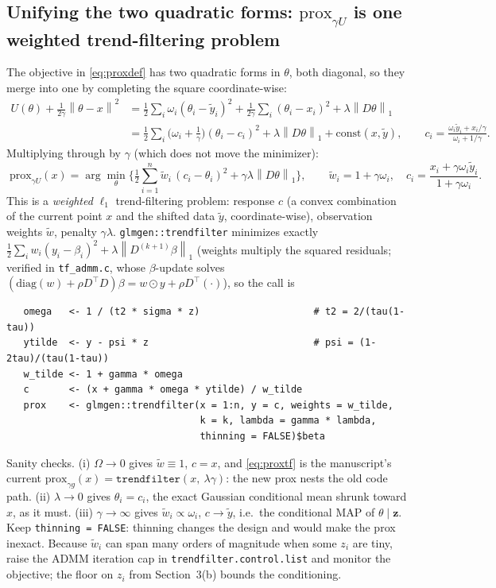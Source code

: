\documentclass[12pt]{article}
\newcommand{\bz}{\bm{z}}
\newcommand{\norm}[1]{\left\lVert#1\right\rVert}
\newcommand{\prox}{\mathrm{prox}}
\newcommand{\diag}{\mathrm{diag}}
\newcommand{\tf}{\texttt{trendfilter}}
\begin{document}
\subsection{Unifying the two quadratic forms: $\prox_{\gamma U}$ is one weighted trend-filtering problem}

The objective in \eqref{eq:proxdef} has two quadratic forms in $\theta$, both diagonal, so they
merge into one by completing the square coordinate-wise:
\begin{align*}
    U(\theta)+\tfrac1{2\gamma}\norm{\theta-x}^2
    &=\tfrac12\sum_i\omega_i(\theta_i-\tilde y_i)^2+\tfrac1{2\gamma}\sum_i(\theta_i-x_i)^2+\lambda\norm{D\theta}_1\\
    &=\tfrac12\sum_i\Big(\omega_i+\tfrac1\gamma\Big)(\theta_i-c_i)^2+\lambda\norm{D\theta}_1+\text{const}(x,\tilde y),
    \qquad c_i=\frac{\omega_i\tilde y_i+x_i/\gamma}{\omega_i+1/\gamma}.
\end{align*}
Multiplying through by $\gamma$ (which does not move the minimizer):
\begin{equation}
    \boxed{\;
    \prox_{\gamma U}(x)=\arg\min_\theta\Big\{\tfrac12\sum_{i=1}^n \tilde w_i\,(c_i-\theta_i)^2+\gamma\lambda\norm{D\theta}_1\Big\},
    \qquad
    \tilde w_i=1+\gamma\omega_i,\quad
    c_i=\frac{x_i+\gamma\omega_i\tilde y_i}{1+\gamma\omega_i}.\;}
    \label{eq:proxtf}
\end{equation}
This is a \emph{weighted} $\ell_1$ trend-filtering problem: response $c$ (a convex combination
of the current point $x$ and the shifted data $\tilde y$, coordinate-wise), observation weights
$\tilde w$, penalty $\gamma\lambda$. \texttt{glmgen::trendfilter} minimizes exactly
$\tfrac12\sum_i w_i(y_i-\beta_i)^2+\lambda\norm{D^{(k+1)}\beta}_1$ (weights multiply the squared
residuals; verified in \texttt{tf\_admm.c}, whose $\beta$-update solves
$(\diag(w)+\rho D^\top D)\beta=w\odot y+\rho D^\top(\cdot)$), so the call is
\begin{verbatim}
   omega   <- 1 / (t2 * sigma * z)                    # t2 = 2/(tau(1-tau))
   ytilde  <- y - psi * z                             # psi = (1-2tau)/(tau(1-tau))
   w_tilde <- 1 + gamma * omega
   c       <- (x + gamma * omega * ytilde) / w_tilde
   prox    <- glmgen::trendfilter(x = 1:n, y = c, weights = w_tilde,
                                  k = k, lambda = gamma * lambda,
                                  thinning = FALSE)$beta
\end{verbatim}
Sanity checks. (i) $\Omega\to0$ gives $\tilde w\equiv1$, $c=x$, and \eqref{eq:proxtf} is the
manuscript's current $\prox_{\gamma g}(x)=\tf(x,\ \lambda\gamma)$: the new prox nests the old code
path. (ii) $\lambda\to0$ gives $\theta_i=c_i$, the exact Gaussian conditional mean shrunk toward
$x$, as it must. (iii) $\gamma\to\infty$ gives $\tilde w_i\propto\omega_i$, $c\to\tilde y$, i.e.\ the
conditional MAP of $\theta\mid\bz$. Keep \texttt{thinning = FALSE}: thinning changes the design
and would make the prox inexact. Because $\tilde w_i$ can span many orders of magnitude when
some $z_i$ are tiny, raise the ADMM iteration cap in \texttt{trendfilter.control.list} and
monitor the objective; the floor on $z_i$ from Section~3(b) bounds the conditioning.
\end{document}

